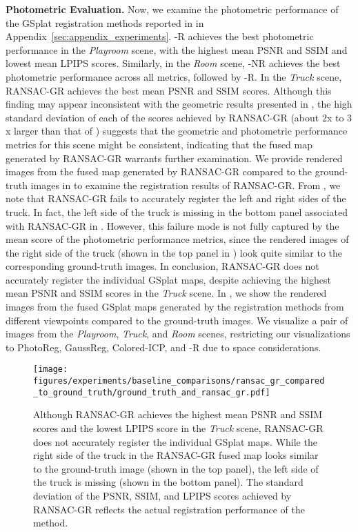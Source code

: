 \smallskip
\noindent\textbf{Photometric Evaluation.}
Now, we examine the photometric performance of the GSplat registration methods reported in  in Appendix~\ref{sec:appendix_experiments}. \algname-R achieves the best photometric performance in the \emph{Playroom} scene, with the highest mean PSNR and SSIM and lowest mean LPIPS scores. Similarly, in the \emph{Room} scene, \algname-NR achieves the best photometric performance across all metrics, followed by \algname-R. In the \emph{Truck} scene, RANSAC-GR achieves the best mean PSNR and SSIM scores. Although this finding may appear inconsistent with the geometric results presented in , the high standard deviation of each of the scores achieved by RANSAC-GR (about $2$x to $3$x larger than that of \algname) suggests that the geometric and photometric performance metrics for this scene might be consistent, indicating that the fused map generated by RANSAC-GR warrants further examination.
We provide rendered images from the fused map generated by RANSAC-GR compared to the ground-truth images in  to examine the registration results of RANSAC-GR. From , we note that RANSAC-GR fails to accurately register the left and right sides of the truck. In fact, the left side of the truck is missing in the bottom panel associated with RANSAC-GR in . However, this failure mode is not fully captured by the mean score of the photometric performance metrics, since the rendered images of the right side of the truck (shown in the top panel in ) look quite similar to the corresponding ground-truth images. In conclusion, RANSAC-GR does not accurately register the individual GSplat maps, despite achieving the highest mean PSNR and SSIM scores in the \emph{Truck} scene.
In , we show the rendered images from the fused GSplat maps generated by the registration methods from different viewpoints compared to the ground-truth images. We visualize a pair of images from the \emph{Playroom}, \emph{Truck}, and \emph{Room} scenes, restricting our visualizations to PhotoReg, GaussReg, Colored-ICP, and \algname-R due to space considerations. 


\begin{figure}[th]
    \centering
    \texttt{[image: figures/experiments/baseline\_comparisons/ransac\_gr\_compared\_to\_ground\_truth/ground\_truth\_and\_ransac\_gr.pdf]}
    \caption{Although RANSAC-GR achieves the highest mean PSNR and SSIM scores and the lowest LPIPS score in the \emph{Truck} scene, RANSAC-GR does not accurately register the individual GSplat maps. While the right side of the truck in the RANSAC-GR fused map looks similar to the ground-truth image (shown in the top panel), the left side of the truck is missing (shown in the bottom panel). The standard deviation of the PSNR, SSIM, and LPIPS scores achieved by RANSAC-GR reflects the actual registration performance of the method.}
    \label{fig:ransac_gr_vs_ground_truth}
\end{figure}


